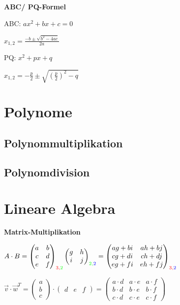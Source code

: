 \textbf{ABC/ PQ-Formel}

ABC: $ax^2 + bx + c = 0$

$\displaystyle{
    x_{1,2} = \frac{-b \pm \sqrt{ b^2 - 4ac }}{2a}
}$

PQ: $x^2 + px + q$

$\displaystyle{
    x_{1,2} = -\frac{p}{2} \pm \sqrt{\left(\frac{p}{2}\right)^2 - q}
}$

\section{Polynome}

\subsection{Polynommultiplikation}

\subsection{Polynomdivision}

\section{Lineare Algebra}

\textbf{Matrix-Multiplikation}

$\displaystyle{
    A \cdot B = 
    \begin{pmatrix}
        a & b\\
        c & d\\
        e & f
    \end{pmatrix}_{\color{red} 3 , \color{green} 2 }
    \begin{pmatrix}
        g & h\\
        i & j
    \end{pmatrix}_{\color{green} 2, \color{blue} 2}
    = 
    \begin{pmatrix}
        a g + b i & a h + b j\\
        c g + d i & c h + d j\\
        e g + f i & e h + f j
    \end{pmatrix}_{\color{red} 3, \color{blue} 2}
}$

$\displaystyle{
    \vec{v} \cdot \vec{w}^T = 
    \begin{pmatrix}
        a \\
        b\\
        c
    \end{pmatrix}
    \cdot
    \begin{pmatrix}
        d & e & f
    \end{pmatrix}
    = 
    \begin{pmatrix}
        a \cdot d & a \cdot e & a \cdot f\\
        b \cdot d & b \cdot e & b \cdot f\\
        c \cdot d & c \cdot e & c \cdot f
    \end{pmatrix}
}$

